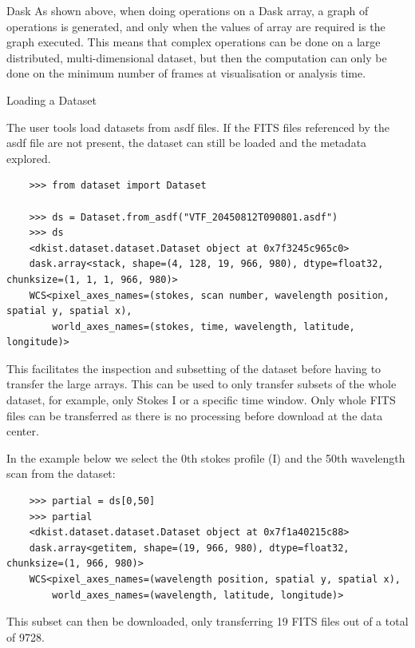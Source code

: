 \documentclass[landscape,a0paper,fontscale=0.32]{baposter}
\begin{document}
\begin{poster}
\begin{posterbox}[name=dask,column=1,row=0,span=1,below=intro]{Dask}
  As shown above, when doing operations on a Dask array, a graph of operations
  is generated, and only when the values of array are required is the graph
  executed. This means that complex operations can be done on a large distributed,
  multi-dimensional dataset, but then the computation can only be done on the
  minimum number of frames at visualisation or analysis time.

\end{posterbox}
 
\begin{posterbox}[name=dataset,column=2,row=0,span=2]{Loading a Dataset}

  The user tools load datasets from asdf files. If the FITS files referenced
  by the asdf file are not present, the dataset can still be loaded and the
  metadata explored.
 
  \begin{verbatim}
    >>> from dataset import Dataset

    >>> ds = Dataset.from_asdf("VTF_20450812T090801.asdf")
    >>> ds
    <dkist.dataset.dataset.Dataset object at 0x7f3245c965c0>
    dask.array<stack, shape=(4, 128, 19, 966, 980), dtype=float32, chunksize=(1, 1, 1, 966, 980)>
    WCS<pixel_axes_names=(stokes, scan number, wavelength position, spatial y, spatial x),
        world_axes_names=(stokes, time, wavelength, latitude, longitude)>
  \end{verbatim}

  This facilitates the inspection and subsetting of the dataset before having to
  transfer the large arrays. This can be used to only transfer subsets of the
  whole dataset, for example, only Stokes I or a specific time window. Only
  whole FITS files can be transferred as there is no processing before download
  at the data center.

  In the example below we select the 0th stokes profile (I) and the 50th
  wavelength scan from the dataset:
  
  \begin{verbatim}
    >>> partial = ds[0,50]
    >>> partial
    <dkist.dataset.dataset.Dataset object at 0x7f1a40215c88>
    dask.array<getitem, shape=(19, 966, 980), dtype=float32, chunksize=(1, 966, 980)>
    WCS<pixel_axes_names=(wavelength position, spatial y, spatial x),
        world_axes_names=(wavelength, latitude, longitude)>
  \end{verbatim}

  This subset can then be downloaded, only transferring 19 FITS files out of a
  total of 9728.


\end{posterbox}
\end{poster}
\end{document}

